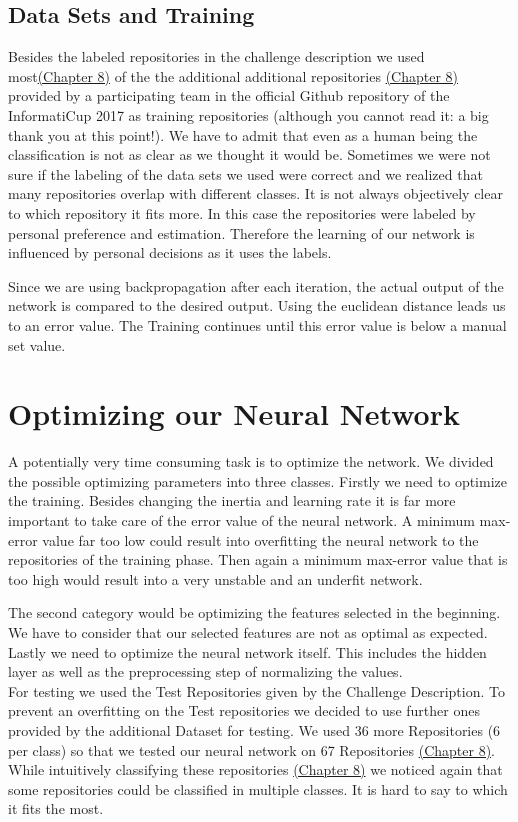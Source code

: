 \documentclass[paper=A4,pagesize=auto,12pt,headinclude=true,footinclude=true,BCOR=0mm,DIV=calc]{scrartcl}
\begin{document}
	
	
	
	
	\subsection{Data Sets and Training}
	Besides the labeled repositories in the challenge description we used most\hyperref[src:TrainingRepositories]{(Chapter 8)} of the the additional additional repositories \hyperref[src:Repositories]{(Chapter 8)} provided by a participating team in the official Github repository of the InformatiCup 2017 as training repositories (although you cannot read it: a big thank you at this point!). We have to admit that even as a human being the classification is not as clear as we thought it would be. Sometimes we were not sure if the labeling of the data sets we used were correct and we realized that many repositories overlap with different classes. It is not always objectively clear to which repository it fits more. In this case the repositories were labeled by personal preference and estimation. Therefore the learning of our network is influenced by personal decisions as it uses the labels.
	
	Since we are using backpropagation after each iteration, the actual output of the network is compared to the desired output. Using the euclidean distance leads us to an error value. The Training continues until this error value is below a manual set value.
	
	
	
	\section{Optimizing our Neural Network }
	\label{src:optimizing}
	A potentially very time consuming task is to optimize the network. We divided the possible optimizing parameters into three classes. Firstly we need to optimize the training. Besides changing the inertia and learning rate it is far more important to take care of the error value of the neural network. A minimum max-error value far too low could result into overfitting the neural network to the repositories of the training phase. Then again a minimum max-error value that is too high would result into a very unstable and an underfit network. 
	
	
	The second category would be optimizing the features selected in the beginning. We have to consider that our selected features are not as optimal as expected.
	Lastly we need to optimize the neural network itself. This includes the hidden layer as well as the preprocessing step of normalizing the values.\\
	For testing we used the Test Repositories given by the Challenge Description. To prevent an overfitting on the Test repositories we decided to use further ones provided by the additional Dataset for testing. We used 36 more Repositories (6 per class) so that we tested our neural network on 67 Repositories \hyperref[src:TestRepositories]{(Chapter 8)}. While intuitively classifying these repositories \hyperref[src:ClassifyTestRepositories]{(Chapter 8)} we noticed again that some repositories could be classified in multiple classes. It is hard to say to which it fits the most. 
	
\end{document}
